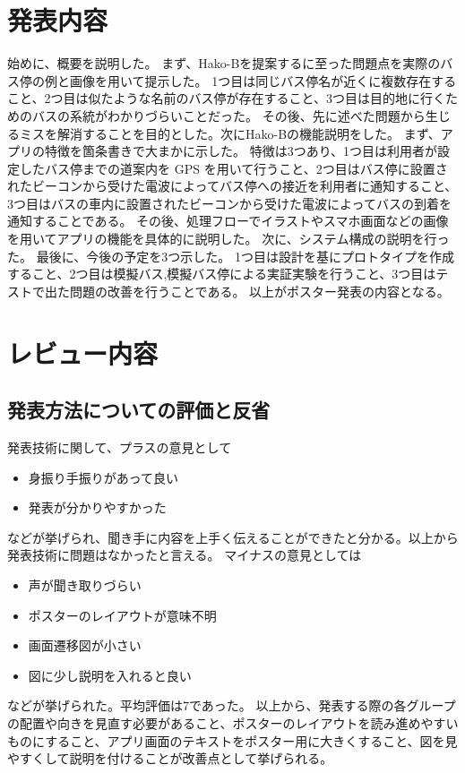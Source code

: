 \documentclass[openany,11pt,papersize]{jsbook}
\begin{document}

\section{発表内容}
始めに、概要を説明した。
まず、Hako-Bを提案するに至った問題点を実際のバス停の例と画像を用いて提示した。
1つ目は同じバス停名が近くに複数存在すること、2つ目は似たような名前のバス停が存在すること、3つ目は目的地に行くためのバスの系統がわかりづらいことだった。
その後、先に述べた問題から生じるミスを解消することを目的とした。次にHako-Bの機能説明をした。
まず、アプリの特徴を箇条書きで大まかに示した。
特徴は3つあり、1つ目は利用者が設定したバス停までの道案内を GPS を用いて行うこと、2つ目はバス停に設置されたビーコンから受けた電波によってバス停への接近を利用者に通知すること、3つ目はバスの車内に設置されたビーコンから受けた電波によってバスの到着を通知することである。
その後、処理フローでイラストやスマホ画面などの画像を用いてアプリの機能を具体的に説明した。
次に、システム構成の説明を行った。
最後に、今後の予定を3つ示した。
1つ目は設計を基にプロトタイプを作成すること、2つ目は模擬バス,模擬バス停による実証実験を行うこと、3つ目はテストで出た問題の改善を行うことである。
以上がポスター発表の内容となる。


\section{レビュー内容}

\subsection{発表方法についての評価と反省}
発表技術に関して、プラスの意見として
\begin{itemize}

\item 身振り手振りがあって良い
\item 発表が分かりやすかった

\end{itemize}
などが挙げられ、聞き手に内容を上手く伝えることができたと分かる。以上から発表技術に問題はなかったと言える。
マイナスの意見としては
\begin{itemize}

\item 声が聞き取りづらい
\item ポスターのレイアウトが意味不明
\item 画面遷移図が小さい
\item 図に少し説明を入れると良い

\end{itemize}
などが挙げられた。平均評価は7であった。
以上から、発表する際の各グループの配置や向きを見直す必要があること、ポスターのレイアウトを読み進めやすいものにすること、アプリ画面のテキストをポスター用に大きくすること、図を見やすくして説明を付けることが改善点として挙げられる。
\end{document}
